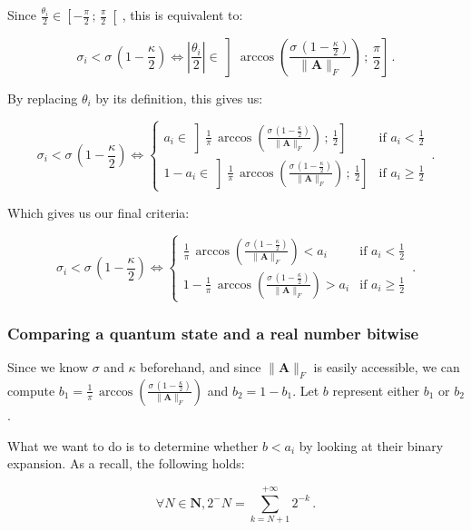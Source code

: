 \documentclass[11pt, a4paper]{article}
\begin{document}
                Since \(\frac{\theta_i}{2}\in\left[-\frac\pi2\,;\,\frac\pi2\right[\), this is equivalent to:
                
                \[\sigma_i < \sigma\,\left(1 - \frac\kappa2\right)\iff\left|\frac{\theta_i}{2}\right|\in\left]\arccos\left(\frac{\sigma\,\left(1 - \frac\kappa2\right)}{\|\mathbf{A}\|_F}\right)\,;\,\frac\pi2\right]\,.\]
                
                By replacing \(\theta_i\) by its definition, this gives us:
                
                \[\sigma_i < \sigma\,\left(1 - \frac\kappa2\right)\iff\begin{cases}a_i\in\left]\frac1\pi\,\arccos\left(\frac{\sigma\,\left(1 - \frac\kappa2\right)}{\|\mathbf{A}\|_F}\right)\,;\,\frac12\right]&\text{if }a_i<\frac12\\1-a_i\in\left]\frac1\pi\,\arccos\left(\frac{\sigma\,\left(1 - \frac\kappa2\right)}{\|\mathbf{A}\|_F}\right)\,;\,\frac12\right]&\text{if }a_i\geqslant\frac12\end{cases}\,.\]
                
                Which gives us our final criteria:
                
                \[\sigma_i < \sigma\,\left(1 - \frac\kappa2\right)\iff\begin{cases}\frac1\pi\,\arccos\left(\frac{\sigma\,\left(1 - \frac\kappa2\right)}{\|\mathbf{A}\|_F}\right) < a_i&\text{if }a_i<\frac12\\1-\frac1\pi\,\arccos\left(\frac{\sigma\,\left(1 - \frac\kappa2\right)}{\|\mathbf{A}\|_F}\right) > a_i&\text{if }a_i\geqslant\frac12\end{cases}\,.\]
            
            \subsubsection{Comparing a quantum state and a real number bitwise}
                Since we know \(\sigma\) and \(\kappa\) beforehand, and since \(\|\mathbf{A}\|_F\) is easily accessible, we can compute \(b_1=\frac1\pi\,\arccos\left(\frac{\sigma\,\left(1 - \frac\kappa2\right)}{\|\mathbf{A}\|_F}\right)\) and \(b_2 = 1 - b_1\). Let \(b\) represent either \(b_1\) or \(b_2\).
                
                What we want to do is to determine whether \(b<a_i\) by looking at their binary expansion. As a recall, the following holds:
                
                \[\forall N\in\mathbf{N},2^-N=\sum_{k=N+1}^{+\infty}2^{-k}\,.\]
                
\end{document}
